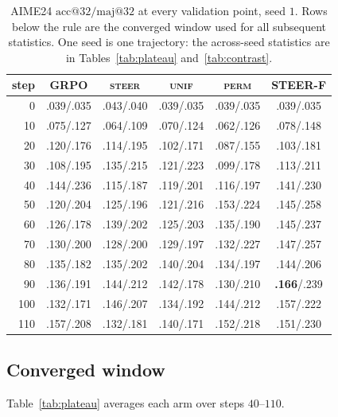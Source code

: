 \documentclass[11pt]{article}
\begin{document}
\begin{table}[t]
\centering
\footnotesize
\setlength{\tabcolsep}{2.6pt}
\begin{tabular}{@{}rccccc@{}}
\toprule
step & GRPO & \textsc{steer} & \textsc{unif} & \textsc{perm} & \textbf{STEER-F} \\
\midrule
0   & .039/.035 & .043/.040 & .039/.035 & .039/.035 & .039/.035 \\
10  & .075/.127 & .064/.109 & .070/.124 & .062/.126 & .078/.148 \\
20  & .120/.176 & .114/.195 & .102/.171 & .087/.155 & .103/.181 \\
30  & .108/.195 & .135/.215 & .121/.223 & .099/.178 & .113/.211 \\
\midrule
40  & .144/.236 & .115/.187 & .119/.201 & .116/.197 & .141/.230 \\
50  & .120/.204 & .125/.196 & .121/.216 & .153/.224 & .145/.258 \\
60  & .126/.178 & .139/.202 & .125/.203 & .135/.190 & .145/.237 \\
70  & .130/.200 & .128/.200 & .129/.197 & .132/.227 & .147/.257 \\
80  & .135/.182 & .135/.202 & .140/.204 & .134/.197 & .144/.206 \\
90  & .136/.191 & .144/.212 & .142/.178 & .130/.210 & \textbf{.166}/.239 \\
100 & .132/.171 & .146/.207 & .134/.192 & .144/.212 & .157/.222 \\
110 & .157/.208 & .132/.181 & .140/.171 & .152/.218 & .151/.230 \\
\bottomrule
\end{tabular}
\caption{AIME24 $\mathrm{acc@}32/\mathrm{maj@}32$ at every validation point, seed
$1$. Rows below the rule are the converged window used for all subsequent
statistics. One seed is one trajectory: the across-seed statistics are in
Tables~\ref{tab:plateau} and~\ref{tab:contrast}.}
\label{tab:curve}
\end{table}

\subsection{Converged window}
\label{sec:res:main}

Table~\ref{tab:plateau} averages each arm over steps $40$--$110$.
\end{document}
